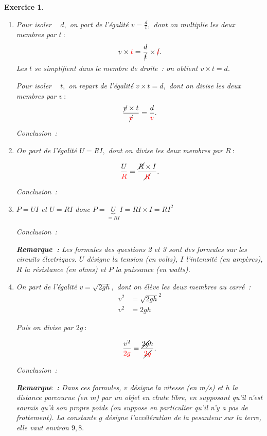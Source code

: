 \documentclass[10pt]{article}
\newtheorem{exo}{Exercice}
\begin{document}
\begin{exo}

\begin{enumerate}
\item Pour \og isoler \fg~{} $d,$ on part de l'égalité $v=\frac{d}{t},$ dont on multiplie les deux membres par $t~:$
\[v\times \textcolor{red}{t}=\frac{d}{\cancel{t}}\times\cancel{\textcolor{red}{t}}.\]
Les $t$ se simplifient dans le membre de droite~: on obtient $v\times t=d.$


\medskip

Pour \og isoler \fg~{} $t,$ on repart de l’égalité $v\times t=d,$ dont on divise les deux membres par $v~:$
\[\frac{\cancel{v}\times t}{\cancel{\textcolor{red}{v}}}=\frac{d}{\textcolor{red}{v}}.\] %

Conclusion~:  \hspace*{2cm} 

\item  On part de l'égalité $U=RI,$ dont on divise les deux membres par $R~:$


\[\frac{U}{\textcolor{red}{R}}=\frac{\cancel{R}\times I}{\cancel{\textcolor{red}{R}}}.\]

Conclusion~: 

\item  $P=UI$ et $U=RI$ donc $P=\underbrace{U}_{=RI}I=RI\times I=RI^2$

Conclusion~: 

\medskip

\textbf{Remarque~:} Les formules des questions 2 et 3 sont des formules sur les circuits électriques. $U$ désigne la tension (en volts), $I$ l'intensité (en ampères), $R$ la résistance (en ohms) et $P$ la puissance (en watts).

\item On part de l'égalité $v=\sqrt{2gh},$ dont on élève les deux membres au carré~:
\begin{align*}
v^2&=\sqrt{2gh}^2\\
v^2&=2gh
\end{align*}

Puis on divise par $2g~:$

\[\frac{v^2}{\textcolor{red}{2g}}=\frac{\cancel{2g} h}{\cancel{\textcolor{red}{2g}}}.\]

Conclusion~: 

\medskip

\textbf{Remarque~:} Dans ces formules, $v$ désigne la vitesse (en m/s) et $h$ la distance parcourue (en m) par un objet en chute libre, en supposant qu'il n'est soumis qu'à son propre poids (on suppose en particulier qu'il n'y a pas de frottement). La constante $g$ désigne l'accélération de la pesanteur sur la terre, elle vaut environ $9,8.$


\end{enumerate}
\end{exo}
\end{document}
